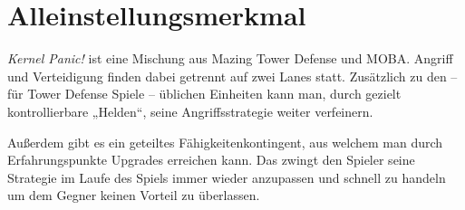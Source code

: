 \section{Alleinstellungsmerkmal}


\textit{Kernel Panic!} ist eine Mischung aus Mazing Tower Defense und MOBA.
Angriff und Verteidigung finden dabei getrennt auf zwei Lanes statt.
Zusätzlich zu den -- für Tower Defense Spiele -- üblichen Einheiten kann man, durch gezielt kontrollierbare „Helden“, seine Angriffsstrategie weiter verfeinern.

Außerdem gibt es ein geteiltes Fähigkeitenkontingent, aus welchem man durch Erfahrungspunkte Upgrades erreichen kann. Das zwingt den Spieler seine Strategie im Laufe des Spiels immer wieder anzupassen und schnell zu handeln um dem Gegner keinen Vorteil zu überlassen.
